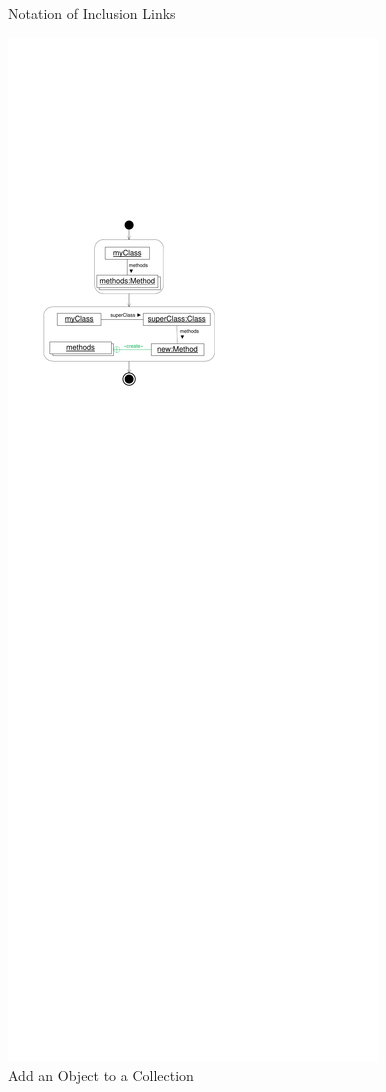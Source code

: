 \begin{figure}[htb]
\begin{minipage}{.43\textwidth}
    \caption{Notation of Inclusion Links}
    \label{fig:InlucionLinks}
	\end{minipage}
  \hfill
  \begin{minipage}{.47\textwidth}
  	\centering
		\includegraphics[width=\linewidth]{figures/InclusionLinksExample1}
    \caption{Add an Object to a Collection}
    \label{fig:InclusionLinksExample1}
	\end{minipage}
\end{figure}

